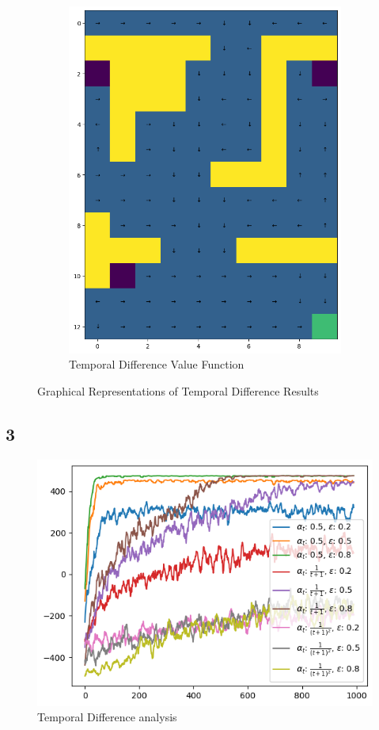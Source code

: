 \begin{figure}[H]
\begin{subfigure}[b]{0.49\textwidth}
        \centering
        \includegraphics[width=\textwidth]{assets/td/td_policy.png}        
        \caption{Temporal Difference Value Function}
    \end{subfigure}
    \caption*{Graphical Representations of Temporal Difference Results}
\end{figure} 


\subsection*{3}

\begin{figure}[H]
    \centering
    \includegraphics[width=\textwidth]{assets/td/td_analysis.png}        
    \caption{Temporal Difference analysis}
\end{figure} 
